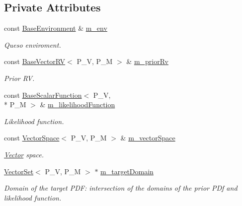 \subsection*{Private Attributes}
\begin{DoxyCompactItemize}
\item 
const \hyperlink{class_q_u_e_s_o_1_1_base_environment}{Base\-Environment} \& \hyperlink{class_q_u_e_s_o_1_1_m_l_sampling_a13f1ca4fe9f94822fe572a743eaced1d}{m\-\_\-env}
\begin{DoxyCompactList}\small\item\em Queso enviroment. \end{DoxyCompactList}\item 
const \hyperlink{class_q_u_e_s_o_1_1_base_vector_r_v}{Base\-Vector\-R\-V}$<$ P\-\_\-\-V, P\-\_\-\-M $>$ \& \hyperlink{class_q_u_e_s_o_1_1_m_l_sampling_aa45e9c06bd51cae0dc2294af1831c158}{m\-\_\-prior\-Rv}
\begin{DoxyCompactList}\small\item\em Prior R\-V. \end{DoxyCompactList}\item 
const \hyperlink{class_q_u_e_s_o_1_1_base_scalar_function}{Base\-Scalar\-Function}$<$ P\-\_\-\-V, \\*
P\-\_\-\-M $>$ \& \hyperlink{class_q_u_e_s_o_1_1_m_l_sampling_ab08c3059d23460db49b229aa88bd4e70}{m\-\_\-likelihood\-Function}
\begin{DoxyCompactList}\small\item\em Likelihood function. \end{DoxyCompactList}\item 
const \hyperlink{class_q_u_e_s_o_1_1_vector_space}{Vector\-Space}$<$ P\-\_\-\-V, P\-\_\-\-M $>$ \& \hyperlink{class_q_u_e_s_o_1_1_m_l_sampling_a7bc4c72f65ba9166ed94a6e198b0915b}{m\-\_\-vector\-Space}
\begin{DoxyCompactList}\small\item\em \hyperlink{class_q_u_e_s_o_1_1_vector}{Vector} space. \end{DoxyCompactList}\item 
\hyperlink{class_q_u_e_s_o_1_1_vector_set}{Vector\-Set}$<$ P\-\_\-\-V, P\-\_\-\-M $>$ $\ast$ \hyperlink{class_q_u_e_s_o_1_1_m_l_sampling_a21525858e93a7d9654fdf68c8ac25576}{m\-\_\-target\-Domain}
\begin{DoxyCompactList}\small\item\em Domain of the target P\-D\-F\-: intersection of the domains of the prior P\-Df and likelihood function. \end{DoxyCompactList}\item 

\end{DoxyCompactItemize}
